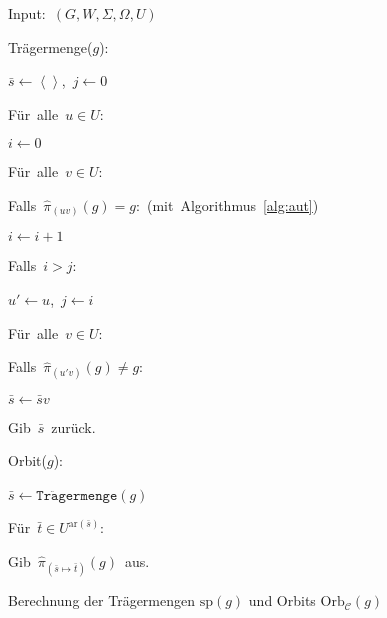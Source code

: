 \begin{algorithm}
\begin{lyxcode}
Input:~$\left(G,W,\Sigma,\Omega,U\right)$

Trägermenge($g$):~

\begin{lyxcode}
$\bar{s}\leftarrow\left\langle \right\rangle $,~$j\leftarrow0$

Für~alle~$u\in U$:~

\begin{lyxcode}
$i\leftarrow0$

Für~alle~$v\in U$:~

\begin{lyxcode}
Falls~$\hat{\pi}_{\left(uv\right)}\left(g\right)=g$:~(mit~Algorithmus~\ref{alg:aut})~

\begin{lyxcode}
$i\leftarrow i+1$
\end{lyxcode}
\end{lyxcode}
Falls~$i>j$:~

\begin{lyxcode}
$u'\leftarrow u$,~$j\leftarrow i$
\end{lyxcode}
\end{lyxcode}
Für~alle~$v\in U$:~

\begin{lyxcode}
Falls~$\hat{\pi}_{\left(u'v\right)}\left(g\right)\neq g$:~

\begin{lyxcode}
$\bar{s}\leftarrow\bar{s}v$
\end{lyxcode}
\end{lyxcode}
Gib~$\bar{s}$~zurück.
\end{lyxcode}
Orbit($g$):~

\begin{lyxcode}
$\bar{s}\leftarrow\mathtt{Tr\ddot{a}germenge}\left(g\right)$~

\begin{lyxcode}
Für~$\bar{t}\in U^{\mathrm{ar}\left(\bar{s}\right)}$:~

\begin{lyxcode}
Gib~$\hat{\pi}_{\left(\bar{s}\mapsto\bar{t}\right)}\left(g\right)$~aus.
\end{lyxcode}
\end{lyxcode}
\end{lyxcode}
\end{lyxcode}
\caption{\label{alg:orbits}Berechnung der Trägermengen $\mathrm{sp}\left(g\right)$
und Orbits $\mathrm{Orb}_{\mathcal{C}}\left(g\right)$}
\end{algorithm}



